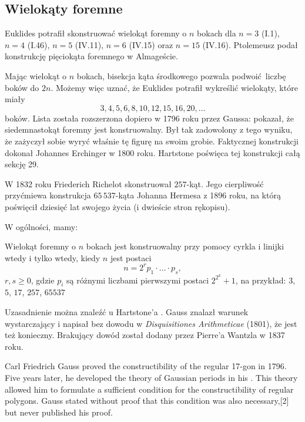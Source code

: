 
\subsection{Wielokąty foremne}
Euklides potrafił skonstruować wielokąt foremny o $n$ bokach dla $n = 3$ (I.1), $n = 4$ (I.46), $n = 5$ (IV.11), $n = 6$ (IV.15) oraz $n = 15$ (IV.16).
Ptolemeusz podał konstrukcję pięciokąta foremnego w Almageście.

Mając wielokąt o $n$ bokach, bisekcja kąta środkowego pozwala podwoić liczbę boków do $2n$.
Możemy więc uznać, że Euklides potrafił wykreślić wielokąty, które miały
\begin{equation}
    3, 4, 5, 6, 8, 10, 12, 15, 16, 20, \ldots
\end{equation}
boków.
Lista została rozszerzona dopiero w 1796 roku przez Gaussa: pokazał, że siedemnastokąt foremny jest konstruowalny.
Był tak zadowolony z tego wyniku, że zażyczył sobie wyryć właśnie tę figurę na swoim grobie.
Faktycznej konstrukcji dokonał Johannes Erchinger w 1800 roku.
%
Hartstone \cite[s. 250-259]{hartshorne2000} poświęca tej konstrukcji całą sekcję 29.

W 1832 roku Friederich Richelot skonstruował $257$-kąt.
Jego cierpliwość przyćmiewa konstrukcja $65\,537$-kąta Johanna Hermesa z 1896 roku, na którą poświęcił dziesięć lat swojego życia (i dwieście stron rękopisu).

W ogólności, mamy:
\begin{theorem}
    Wielokąt foremny o $n$ bokach jest konstruowalny przy pomocy cyrkla i linijki wtedy i tylko wtedy, kiedy $n$ jest postaci
    \begin{equation}
        n = 2^r p_1 \cdot \ldots \cdot p_s,
    \end{equation}
    $r, s \ge 0$, gdzie $p_i$ są różnymi liczbami pierwszymi postaci $2^{2^k} + 1$, na przykład: $3$, $5$, $17$, $257$, $65537$
\end{theorem}

Uzasadnienie można znaleźć u Hartstone'a \cite[s. 258]{hartshorne2000}.
Gauss znalazł warunek wystarczający i napisał bez dowodu w \emph{Disquisitiones Arithmeticae} (1801), że jest też konieczny.
Brakujący dowód został dodany przez Pierre'a Wantzla w 1837 roku.

Carl Friedrich Gauss proved the constructibility of the regular 17-gon in 1796. Five years later, he developed the theory of Gaussian periods in his . This theory allowed him to formulate a sufficient condition for the constructibility of regular polygons. Gauss stated without proof that this condition was also necessary,[2] but never published his proof.






